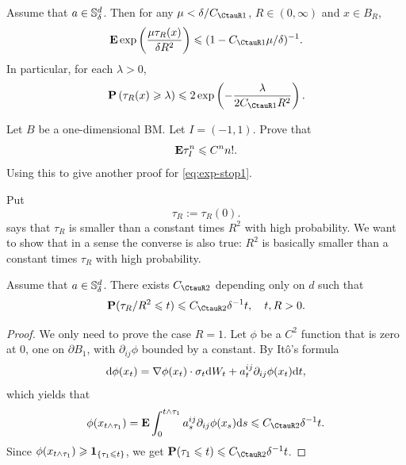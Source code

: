 \begin{theorem}\label{thm:tauR1}
    Assume that \(a\in {\mathbb S}^d_{\delta}\). Then for any $\mu<\delta/C_{\CtauR1}$, \(R\in(0,\infty)\) and \(x\in B_R\), 
    \begin{equation}\label{eq:exp-stop1}
        \bE \exp \l(\frac{\mu {\tau_R}(x)}{\delta R^2}\r) \leq (1-C_{\CtauR1}\mu/\delta)^{-1}. 
    \end{equation}
    In particular, for each $\lambda>0$, 
    \begin{equation}\label{eq:stop-upper}
        \bP\left({\tau_R(x)} \geq \lambda \right) \leq 2 \exp \l( -\frac{\lambda}{2C_{\CtauR1} R^2} \r). 
    \end{equation}
\end{theorem}
	
	\begin{exercise}
		Let $B$ be a one-dimensional BM. Let $I=(-1,1)$. Prove  that 
        \[
            {\mathbf E} \tau_I^n\leqslant C^n n!. 
        \]
        Using this to give another proof for \eqref{eq:exp-stop1}. 
	\end{exercise}
    
    Put
    \[
        \tau_R:=\tau_R(0).
    \]
     says that $\tau_R$ is smaller than a constant times $R^2$ with high probability. We want to show that in a sense the converse is also true: $R^2$ is basically smaller than a constant times $\tau_R$ with high probability. 

\begin{lemma}
    Assume that \(a\in {\mathbb S}^d_{\delta}\). There exists $C_{\CtauR2}$ depending only on $d$ such that 	\begin{equation}\label{eq:stop-lower1}
        \bP(\tau_R/R^2\leq t) \leq C_{\CtauR2}\delta^{-1} t, \quad t, R>0. 
    \end{equation}
\end{lemma}
\begin{proof}
    We only need to prove the case $R=1$. Let $\phi$ be a $C^2$ function that is zero at $0$, one on $\partial B_1$, with $\partial_{i j} \phi$ bounded by a constant.  By It\^o's formula 
    \[
        \text{\rm{d}} \phi(x_t) = \nabla \phi(x_t) \cdot \sigma_t \text{\rm{d}} W_t + a_t^{ij} \partial_{ij} \phi(x_t) \text{\rm{d}} t, 
    \]
    which yields that 
    \[
        \phi(x_{t\wedge \tau_1}) = \bE \int_0^{t\wedge \tau_1} a_{s}^{ij} \p_{ij}\phi(x_s) \d s\leq C_{\CtauR2} \delta^{-1} t. 
    \]
    Since $\phi(x_{t\wedge \tau_1}) \geqslant {\mathbf{1}}_{\{\tau_1\leqslant t\}}$, we get $\bP(\tau_1\leq t)\leq C_{\CtauR2}\delta^{-1} t$. 
\end{proof}

